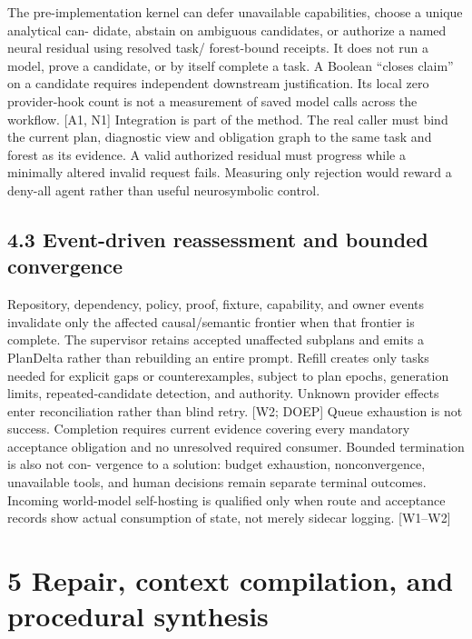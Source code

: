 The pre-implementation kernel can defer unavailable capabilities, choose a unique analytical can-
didate, abstain on ambiguous candidates, or authorize a named neural residual using resolved task/
forest-bound receipts. It does not run a model, prove a candidate, or by itself complete a task. A
Boolean “closes claim” on a candidate requires independent downstream justification. Its local zero
provider-hook count is not a measurement of saved model calls across the workflow. [A1, N1]
Integration is part of the method. The real caller must bind the current plan, diagnostic view and
obligation graph to the same task and forest as its evidence. A valid authorized residual must progress
while a minimally altered invalid request fails. Measuring only rejection would reward a deny-all
agent rather than useful neurosymbolic control.

\subsection*{4.3 Event-driven reassessment and bounded convergence}

Repository, dependency, policy, proof, fixture, capability, and owner events invalidate only the
affected causal/semantic frontier when that frontier is complete. The supervisor retains accepted
unaffected subplans and emits a PlanDelta rather than rebuilding an entire prompt. Refill creates
only tasks needed for explicit gaps or counterexamples, subject to plan epochs, generation limits,
repeated-candidate detection, and authority. Unknown provider effects enter reconciliation rather
than blind retry. [W2; DOEP]
Queue exhaustion is not success. Completion requires current evidence covering every mandatory
acceptance obligation and no unresolved required consumer. Bounded termination is also not con-
vergence to a solution: budget exhaustion, nonconvergence, unavailable tools, and human decisions
remain separate terminal outcomes. Incoming world-model self-hosting is qualified only when route
and acceptance records show actual consumption of state, not merely sidecar logging. [W1–W2]

\section*{5 Repair, context compilation, and procedural synthesis}
